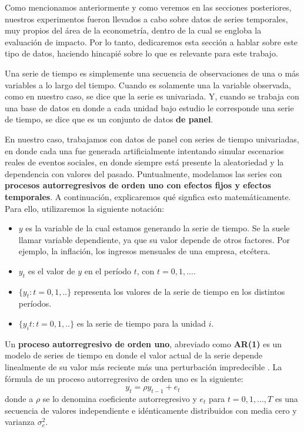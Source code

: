 \documentclass[../../main.tex]{subfiles}
\begin{document}
Como mencionamos anteriormente y como veremos en las secciones posteriores, nuestros
experimentos fueron llevados a cabo sobre datos de series temporales, muy propios del área
de la econometría, dentro de la cual se engloba la evaluación de impacto. Por lo tanto,
dedicaremos esta sección a hablar sobre este tipo de datos, haciendo hincapié sobre lo que
es relevante para este trabajo.

Una serie de tiempo es simplemente una secuencia de observaciones de una o más variables a
lo largo del tiempo. Cuando es solamente una la variable observada, como en nuestro caso,
se dice que la serie es univariada. Y, cuando se trabaja con una base de datos en donde a
cada unidad bajo estudio le corresponde una serie de tiempo, se dice que es un conjunto de
datos \textbf{de panel}.

En nuestro caso, trabajamos con datos de panel con series de tiempo univariadas, en donde
cada una fue generada artificialmente intentando simular escenarios reales de eventos
sociales, en donde siempre está presente la aleatoriedad y la dependencia con valores del
pasado. Puntualmente, modelamos las series con \textbf{procesos autorregresivos de orden
uno con efectos fijos y efectos temporales}. A continuación, explicaremos qué signfica
esto matemáticamente. Para ello, utilizaremos la siguiente notación:
\begin{itemize}
    \item \(y\) es la variable de la cual estamos generando la serie de tiempo. Se
    la suele llamar variable dependiente, ya que su valor depende de otros factores.
    Por ejemplo, la inflación, los ingresos mensuales de una empresa, etcétera.
    \item \(y_t\) es el valor de \(y\) en el período \(t\), con \(t=0,1,...\).
    \item \(\{y_t:t=0,1,..\}\) representa los valores de la serie de tiempo en los
    distintos períodos.
    \item \(\{y_it:t=0,1,..\}\) es la serie de tiempo para la unidad \(i\).
\end{itemize}

Un \textbf{proceso autorregresivo de orden uno}, abreviado como \textbf{AR(1)} es un
modelo de series de tiempo en donde el valor actual de la serie depende linealmente de su
valor más reciente más una perturbación impredecible \cite{intro-econometria}. La fórmula
de un proceso autorregresivo de orden uno es la siguiente:
\[
    y_t = \rho y_{t-1} + e_t
\]
donde a \(\rho\) se lo denomina coeficiente autorregresivo y \(e_t\) para \(t=0,1,...,T\)
es una secuencia de valores independiente e idénticamente distribuidos con media cero y
varianza \(\sigma_e^2\).
\end{document}
